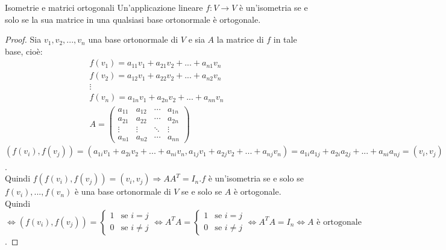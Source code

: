 \documentclass[a4paper]{article}
\theoremstyle{definition}
\begin{document}
	\begin{teo}{Isometrie e matrici ortogonali}
		Un'applicazione lineare $f: V \to V$ è un'isometria se e solo se la sua matrice in una qualsiasi base ortonormale è ortogonale.
	\end{teo}
	\begin{proof}
		Sia $v_1, v_2, ..., v_n$ una base ortonormale di $V$ e sia $A$ la matrice di $f$ in tale base, cioè:
		\begin{align*}
			f(v_1) = a_{11}v_1 + a_{21}v_2 + ... + a_{n1}v_n \\
			f(v_2) = a_{12}v_1 + a_{22}v_2 + ... + a_{n2}v_n \\
			\vdots \\
			f(v_n) = a_{1n}v_1 + a_{2n}v_2 + ... + a_{nn}v_n \\
			A = \begin{pmatrix}
				a_{11} & a_{12} & \cdots & a_{1n} \\
				a_{21} & a_{22} & \cdots & a_{2n} \\
				\vdots & \vdots & \ddots & \vdots \\
				a_{n1} & a_{n2} & \cdots & a_{nn}
			\end{pmatrix}
		\end{align*}
		$(f(v_i), f(v_j)) = (a_{1i}v_1 + a_{2i}v_2 + ... + a_{ni}v_n, a_{1j}v_1 + a_{2j}v_2 + ... + a_{nj}v_n) = a_{1i}a_{1j} + a_{2i}a_{2j} + ... + a_{ni}a_{nj} = (v_i, v_j) = (AA^T)_{ij}$. \\
		Quindi $f(f(v_i), f(v_j)) = (v_i, v_j) \Rightarrow AA^T = I_n. f$ è un'isometria se e solo se $f(v_i), ..., f(v_n)$ è una base ortonormale di $V$ se e solo se $A$ è ortogonale. \\
		Quindi $\Leftrightarrow (f(v_i), f(v_j)) = \begin{cases}
			1 & \text{se } i = j \\
			0 & \text{se } i \ne j
		\end{cases} \Leftrightarrow A^TA = \begin{cases}
			1 & \text{se } i = j \\
			0 & \text{se } i \ne j
		\end{cases} \Leftrightarrow A^TA = I_n \Leftrightarrow A \text{ è ortogonale}$.
	\end{proof}
	
\end{document}
